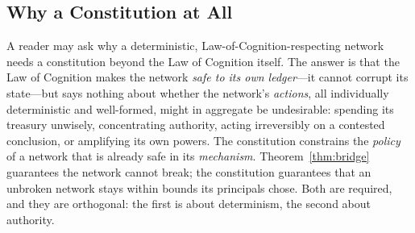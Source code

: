 \subsection{Why a Constitution at All}

A reader may ask why a deterministic, Law-of-Cognition-respecting network needs a constitution beyond the Law of Cognition itself. The answer is that the Law of Cognition makes the network \emph{safe to its own ledger}---it cannot corrupt its state---but says nothing about whether the network's \emph{actions}, all individually deterministic and well-formed, might in aggregate be undesirable: spending its treasury unwisely, concentrating authority, acting irreversibly on a contested conclusion, or amplifying its own powers. The constitution constrains the \emph{policy} of a network that is already safe in its \emph{mechanism}. Theorem~\ref{thm:bridge} guarantees the network cannot break; the constitution guarantees that an unbroken network stays within bounds its principals chose. Both are required, and they are orthogonal: the first is about determinism, the second about authority.

